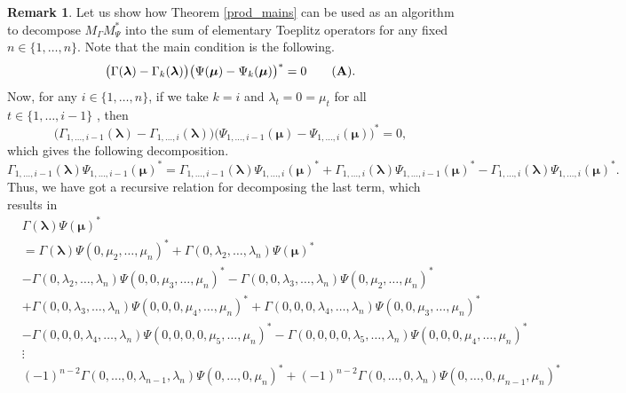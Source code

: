 \documentclass[12pt]{amsart}
\theoremstyle{definition}
\newtheorem{rem}{Remark}[section]
\newcommand{\1}{{\mbox{\bf 1}}}
\begin{document}
\begin{rem}\label{orem}
Let us show how Theorem \ref{prod_mains} can be used as an algorithm to decompose $M_{\Gamma} M_{\Psi}^*$ into the sum of elementary Toeplitz operators for any fixed $n \in \{1,\ldots,n\}$. Note that the main condition is the following.
\[
\big( \Gamma(\bm{\lambda}) - \Gamma_k(\bm{\lambda})\big) \big(  \Psi(\bm{\mu}) - \Psi_k(\bm{\mu}) \big)^* = 0
\tag{\textbf{A}}.
\]
Now, for any $i \in \{1,\ldots,n\}$, if we take $k=i$ and $\lambda_t=0=\mu_t$ for all $t \in \{1,\ldots,i-1\}$ , then 
\[
\big( \Gamma_{1,\ldots,i-1}(\bm{\lambda}) - \Gamma_{1,\ldots,i}(\bm{\lambda})\big) \big(  \Psi_{1,\ldots,i-1}(\bm{\mu}) - \Psi_{1,\ldots,i}(\bm{\mu}) \big)^* = 0,
\]
which gives the following decomposition.
\[
\Gamma_{1,\ldots,i-1} (\bm{\lambda}) \Psi_{1,\ldots,i-1} (\bm{\mu})^*  
=  \Gamma_{1,\ldots,i-1} (\bm{\lambda}) \Psi_{1,\ldots,i} (\bm{\mu})^* 
+ \Gamma_{1,\ldots,i} (\bm{\lambda})  \Psi_{1,\ldots,i-1}(\bm{\mu})^*
-\Gamma_{1,\ldots,i} (\bm{\lambda})  \Psi_{1,\ldots,i}(\bm{\mu})^*.
\]
Thus, we have got a recursive relation for decomposing the last term, which results in
\begin{align*}
&\Gamma(\bm{\lambda}) \Psi(\bm{\mu})^* \\
&= \Gamma(\bm{\lambda}) \Psi(0,\mu_2,\ldots,\mu_n)^* + 
 \Gamma(0,\lambda_2,\ldots,\lambda_n)  \Psi(\bm{\mu})^*\\
&-\Gamma(0,\lambda_2,\ldots,\lambda_n) \Psi(0,0, \mu_3,\ldots,\mu_n)^* 
- \Gamma(0,0, \lambda_3,\ldots,\lambda_n) \Psi(0,\mu_2,\ldots,\mu_n)^* \\
&+\Gamma(0,0, \lambda_3,\ldots,\lambda_n) \Psi(0,0,0,\mu_4,\ldots,\mu_n)^* 
+ \Gamma(0,0,0,\lambda_4,\ldots,\lambda_n) \Psi(0,0,\mu_3,\ldots,\mu_n)^* \\
&-\Gamma(0,0, 0, \lambda_4,\ldots,\lambda_n) \Psi(0,0,0,0,\mu_5,\ldots,\mu_n)^* 
- \Gamma(0,0,0,0,\lambda_5,\ldots,\lambda_n) \Psi(0,0,0,\mu_4,\ldots,\mu_n)^* \\
& \vdots\\
&(-1)^{n-2} \Gamma(0,\ldots,0,\lambda_{n-1}, \lambda_n) \Psi(0,\ldots,0, \mu_n)^* 
+ (-1)^{n-2} \Gamma(0,\ldots,0, \lambda_n) \Psi(0,\ldots,0,\mu_{n-1}, \mu_n)^* \\

\end{align*}
\end{rem}
\end{document}

